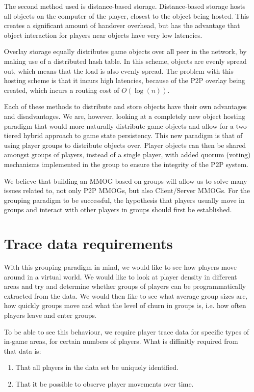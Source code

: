 \documentclass[journal,oneside,a4paper,onecolumn]{IEEEtran}
\begin{document}
The second method used is distance-based storage. Distance-based storage hosts all objects on the computer of the player, closest to the object being
hosted. This creates a significant amount of handover overhead, but has the advantage that object interaction for players near objects have very low
latencies.

Overlay storage equally distributes game objects over all peer in the network, by making use of a distributed hash table. In this scheme, objects are
evenly spread out, which means that the load is also evenly spread. The problem with this hosting scheme is that it incurs high latencies, because of
the P2P overlay being created, which incurs a routing cost of $O(\log(n))$.

Each of these methods to distribute and store objects have their own advantages and disadvantages. We are, however, looking at a completely new
object hosting paradigm that would more naturally distribute game objects and allow for a two-tiered hybrid approach to game state persistency. This
new paradigm is that of using player groups to distribute objects over. Player objects can then be shared amongst groups of players, instead of a
single player, with added quorum (voting) mechanisms implemented in the group to ensure the integrity of the P2P system.

We believe that building an MMOG based on groups will allow us to solve many issues related to, not only P2P MMOGs, but also Client/Server MMOGs. For
the grouping paradigm to be successful, the hypothesis that players usually move in groups and interact with other players in groups should first be
established.

\section{Trace data requirements}

With this grouping paradigm in mind, we would like to see how players move around in a virtual world. We would like to look at player density in
different areas and try and determine whether groups of players can be programmatically extracted from the data. We would then like to see what
average group sizes are, how quickly groups move and what the level of churn in groups is, i.e. how often players leave and enter groups.

To be able to see this behaviour, we require player trace data for specific types of in-game areas, for certain numbers of players. What is
diffinitly required from that data is:
\begin{enumerate}
\item That all players in the data set be uniquely identified.
\item That it be possible to observe player movements over time.
\end{enumerate}
\end{document}
